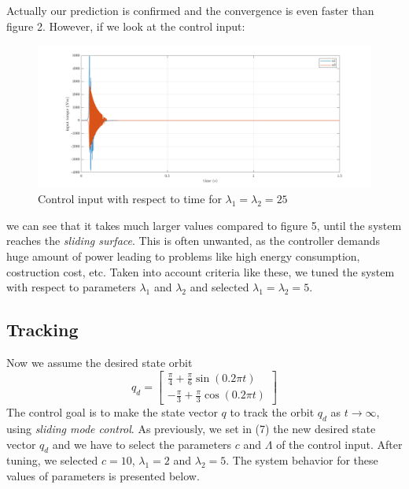 \documentclass[a4paper]{article}
\begin{document}
\newpage
\noindent\hspace{-2pt}
Actually our prediction is confirmed and the convergence is even faster than figure 2. However, if we look at the control input: 
\begin{figure}[H]
    \centering
    \includegraphics[width=15cm]{fig/sim1/u25.png}
    \caption{Control input with respect to time for $\lambda_1 = \lambda_2 = 25$}
\end{figure}

\noindent\hspace{-2pt}
we can see that it takes much larger values compared to figure 5, until the system reaches the \textit{sliding surface}. This is often 
unwanted, as the controller demands huge amount of power leading to problems like high energy consumption, costruction cost, etc.
Taken into account criteria like these, we tuned the system with respect to parameters $\lambda_1$ and $ \lambda_2$ and selected 
$\lambda_1 = \lambda_2 = 5$.

\subsection{Tracking}
Now we assume the desired state orbit
$$
    q_d = \begin{bmatrix}
        \frac{\pi}{4} + \frac{\pi}{6} \sin (0.2 \pi t)\\
        -\frac{\pi}{3} + \frac{\pi}{3} \cos (0.2 \pi t)
    \end{bmatrix}
$$
The control goal is to make the state vector $q$ to track the orbit $q_d$ as $t \rightarrow \infty$, 
using \textit{sliding mode control}. As previously, we set in (7) the new desired state vector $q_d$ 
and we have to select the parameters $c$ and $\Lambda$ of the control input. After tuning, we selected 
$c=10$, $\lambda_1 = 2$ and $\lambda_2 = 5$. The system behavior for these values of parameters is presented 
below.
\end{document}
